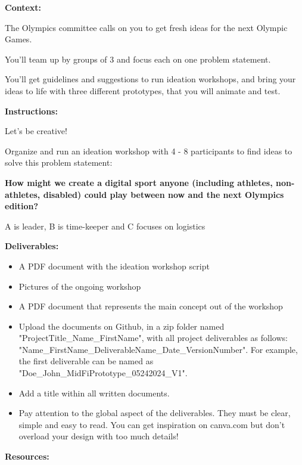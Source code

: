 \makeheaderfiles

\textbf{Context:}

The Olympics committee calls on you to get fresh ideas for the next Olympic Games.

You'll team up by groups of 3 and focus each on one problem statement.

You'll get guidelines and suggestions to run ideation workshops, and bring your ideas to life with three different prototypes, that you will animate and test.

\textbf{Instructions:}

Let's be creative!

Organize and run an ideation workshop with 4 - 8 participants to find ideas to solve this problem statement:

\textbf{How might we create a digital sport anyone (including athletes, non-athletes, disabled) could play between now and the next Olympics edition?}

A is leader, B is time-keeper and C focuses on logistics

\textbf{Deliverables:}

\begin{itemize}
\item A PDF document with the ideation workshop script
\item Pictures of the ongoing workshop
\item A PDF document that represents the main concept out of the workshop
\item Upload the documents on Github, in a zip folder named "ProjectTitle\_Name\_FirstName", with all project deliverables as follows: "Name\_FirstName\_DeliverableName\_Date\_VersionNumber".  For example, the first deliverable can be named as "Doe\_John\_MidFiPrototype\_05242024\_V1".
\item Add a title within all written documents.
\item Pay attention to the global aspect of the deliverables. They must be clear, simple and easy to read. You can get inspiration on canva.com but don't overload your design with too much details!
\end{itemize}

\textbf{Resources:}


